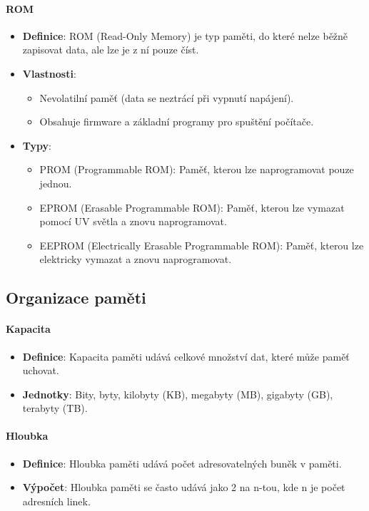 \paragraph{ROM}
\begin{itemize}
    \item \textbf{Definice}: ROM (Read-Only Memory) je typ paměti, do které nelze běžně zapisovat data, ale lze je z ní pouze číst.
    \item \textbf{Vlastnosti}:
    \begin{itemize}
        \item Nevolatilní paměť (data se neztrácí při vypnutí napájení).
        \item Obsahuje firmware a základní programy pro spuštění počítače.
    \end{itemize}
    \item \textbf{Typy}:
    \begin{itemize}
        \item PROM (Programmable ROM): Paměť, kterou lze naprogramovat pouze jednou.
        \item EPROM (Erasable Programmable ROM): Paměť, kterou lze vymazat pomocí UV světla a znovu naprogramovat.
        \item EEPROM (Electrically Erasable Programmable ROM): Paměť, kterou lze elektricky vymazat a znovu naprogramovat.
    \end{itemize}
\end{itemize}

\subsection{Organizace paměti}
\paragraph{Kapacita}
\begin{itemize}
    \item \textbf{Definice}: Kapacita paměti udává celkové množství dat, které může paměť uchovat.
    \item \textbf{Jednotky}: Bity, byty, kilobyty (KB), megabyty (MB), gigabyty (GB), terabyty (TB).
\end{itemize}

\paragraph{Hloubka}
\begin{itemize}
    \item \textbf{Definice}: Hloubka paměti udává počet adresovatelných buněk v paměti.
    \item \textbf{Výpočet}: Hloubka paměti se často udává jako 2 na n-tou, kde n je počet adresních linek.
\end{itemize}

